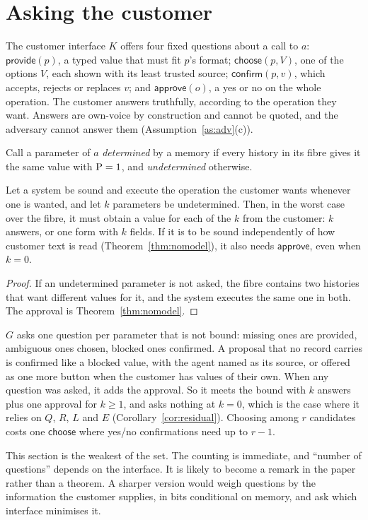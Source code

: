 \section{Asking the customer}\label{sec:queries}

\begin{definition}[Interface]
The customer interface $K$ offers four fixed questions about a call to $a$: $\mathsf{provide}(p)$,
a typed value that must fit $p$'s format; $\mathsf{choose}(p, V)$, one of the options $V$, each
shown with its least trusted source; $\mathsf{confirm}(p, v)$, which accepts, rejects or replaces
$v$; and $\mathsf{approve}(o)$, a yes or no on the whole operation. The customer answers
truthfully, according to the operation they want. Answers are own-voice by construction and
cannot be quoted, and the adversary cannot answer them (Assumption~\ref{as:adv}(c)).
\end{definition}

Call a parameter of $a$ \emph{determined} by a memory if every history in its fibre gives it the
same value with $\mathrm{P} = 1$, and \emph{undetermined} otherwise.

\begin{proposition}\label{prop:queries}
Let a system be sound and execute the operation the customer wants whenever one is wanted, and
let $k$ parameters be undetermined. Then, in the worst case over the fibre, it must obtain a value
for each of the $k$ from the customer: $k$ answers, or one form with $k$ fields. If it is to be
sound independently of how customer text is read (Theorem~\ref{thm:nomodel}), it also needs
$\mathsf{approve}$, even when $k = 0$.
\end{proposition}
\begin{proof}
If an undetermined parameter is not asked, the fibre contains two histories that want different
values for it, and the system executes the same one in both. The approval is
Theorem~\ref{thm:nomodel}.
\end{proof}

$G$ asks one question per parameter that is not bound: missing ones are provided, ambiguous ones
chosen, blocked ones confirmed. A proposal that no record carries is confirmed like a blocked value,
with the agent named as its source, or offered as one more button when the customer has values of
their own. When any question was asked, it adds the approval. So it meets the
bound with $k$ answers plus one approval for $k \geq 1$, and asks nothing at $k = 0$, which is the
case where it relies on $Q$, $R$, $L$ and $E$ (Corollary~\ref{cor:residual}). Choosing among $r$
candidates costs one $\mathsf{choose}$ where yes/no confirmations need up to $r - 1$.

\begin{remark}
This section is the weakest of the set. The counting is immediate, and ``number of questions''
depends on the interface. It is likely to become a remark in the paper rather than a theorem. A
sharper version would weigh questions by the information the customer supplies, in bits
conditional on memory, and ask which interface minimises it.
\end{remark}

